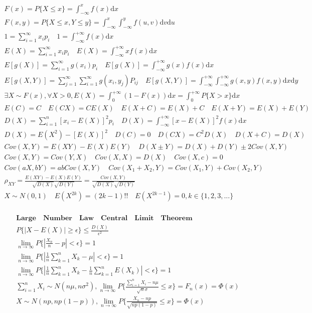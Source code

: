 \documentclass{article}
\begin{document}
\begin{align*}
    F(x) = P\{X \le x\} = \int_{-\infty}^{x} f(x) \mathrm{d}x \\ 
    F(x,y) = P\{X \le x,Y \le y\} = \int_{-\infty}^{x}\int_{-\infty}^{y}f(u,v)\mathrm{d}v\mathrm{d}u \\
    1 = \sum_{i=1}^{\infty} x_{i}p_{i} \quad 1 = \int_{-\infty}^{+\infty}f(x)\mathrm{d}x \\ 
    E(X) = \sum_{i=1}^{\infty}x_{i}p_{i} \quad E(X) = \int_{-\infty}^{+\infty}xf(x)\mathrm{d}x \\  
    E[g(X)] = \sum_{i=1}^{\infty}g(x_{i})p_{i} \quad E[g(X)] = \int_{-\infty}^{+\infty}g(x)f(x)\mathrm{d} x \\
    E[g(X,Y)] = \sum_{j=1}^{\infty}\sum_{i=1}^{\infty}g(x_{i},y_{j})P_{ij} \quad E[g(X,Y)] = \int_{-\infty}^{+\infty}\int_{-\infty}^{+\infty}g(x,y)f(x,y)\mathrm{d}x\mathrm{d}y \\ 
    \exists X \sim F(x) ,\forall X > 0 , E(X) = \int_{0}^{+\infty}(1-F(x))\mathrm{d}x = \int_{0}^{+\infty} P\{X>x\}\mathrm{d}x \\ 
    E(C) = C \quad E(CX) = CE(X) \quad E(X+C) = E(X)+C \quad E(X+Y) = E(X)+E(Y) \\ 
    D(X) = \sum_{i=1}^{n}[x_{i}-E(X)]^2p_{i} \quad D(X) = \int_{-\infty}^{+\infty}[x-E(X)]^2f(x)\mathrm{d}x \\ 
    D(X) = E(X^2)-[E(X)]^2 \quad D(C) = 0 \quad D(CX)=C^2D(X) \quad D(X+C) = D(X) \\ 
    Cov(X,Y) = E(XY) - E(X)E(Y) \quad D(X\pm Y) = D(X)+D(Y)\pm 2Cov(X,Y) \\ 
    Cov(X,Y) = Cov(Y,X) \quad Cov(X,X) = D(X) \quad Cov(X,c) = 0 \\ 
    Cov(aX,bY) = abCov(X,Y) \quad Cov(X_{1}+X_{2},Y) = Cov(X_{1},Y)+Cov(X_{2},Y) \\ 
    \rho_{XY} = \frac{E(XY)-E(X)E(Y)}{\sqrt{D(X)}\sqrt{D(Y)}}= \frac{Cov(X,Y)}{\sqrt{D(X)}\sqrt{D(Y)}} \\ 
    X \sim N(0,1) \quad E(X^{2k}) = (2k-1)!! \quad E(X^{2k-1}) = 0 , k \in \{1,2,3,...\} \\ 
\end{align*}

\begin{align*}
    \mathbf{Large \quad Number \quad Law \quad Central \quad Limit \quad Theorem } \\ 
    P \{ {|X-E(X)|\ge \epsilon} \} \le \frac{D(X)}{\epsilon^{2}} \\
    \lim_{n \to \infty}P\{|\frac{X_{n}}{n}-p| < \epsilon\} = 1 \\
    \lim_{n \to \infty}P\{|\frac{1}{n}\sum_{k=1}^nX_{k}-\mu|<\epsilon\} = 1 \\
    \lim_{n \to \infty}P\{|\frac{1}{n}\sum_{k=1}^n X_{k} - \frac{1}{n}\sum_{k=1}^n E(X_{k})| < \epsilon\} = 1 \\ 
    \sum_{i=1}^{n}X_{i} \sim N(n\mu,n\sigma^2), \lim_{n \to \infty}P\{\frac{\sum_{i=1}^nX_{i}-n\mu}{\sqrt{n}\sigma} \le x\} = F_{n}(x) = \Phi(x) \\ 
    X \sim N(np,np(1-p)), \lim_{n \to \infty }P\{\frac{X_{n}-np}{\sqrt{np(1-p)}} \le x \} = \Phi(x) \\ 
\end{align*}
\end{document}
